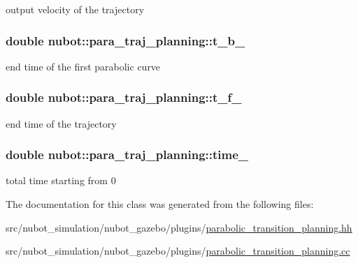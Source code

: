 output velocity of the trajectory 

\hypertarget{classnubot_1_1para__traj__planning_a89b8a9abfcb47b34ac861127fe26b8ca}{
\subsubsection[{t\-\_\-b\-\_\-}]{\setlength{\rightskip}{0pt plus 5cm}double nubot\-::para\-\_\-traj\-\_\-planning\-::t\-\_\-b\-\_\-\hspace{0.3cm}{\ttfamily [private]}}}\label{classnubot_1_1para__traj__planning_a89b8a9abfcb47b34ac861127fe26b8ca}


end time of the first parabolic curve 

\hypertarget{classnubot_1_1para__traj__planning_a9c93d92b950dcb6f34b3c3b843aad823}{
\subsubsection[{t\-\_\-f\-\_\-}]{\setlength{\rightskip}{0pt plus 5cm}double nubot\-::para\-\_\-traj\-\_\-planning\-::t\-\_\-f\-\_\-\hspace{0.3cm}{\ttfamily [private]}}}\label{classnubot_1_1para__traj__planning_a9c93d92b950dcb6f34b3c3b843aad823}


end time of the trajectory 

\hypertarget{classnubot_1_1para__traj__planning_a06fe0c4fbd1afaa2a33672a85705410a}{
\subsubsection[{time\-\_\-}]{\setlength{\rightskip}{0pt plus 5cm}double nubot\-::para\-\_\-traj\-\_\-planning\-::time\-\_\-\hspace{0.3cm}{\ttfamily [private]}}}\label{classnubot_1_1para__traj__planning_a06fe0c4fbd1afaa2a33672a85705410a}


total time starting from 0 



The documentation for this class was generated from the following files\-:\begin{DoxyCompactItemize}
\item 
src/nubot\-\_\-simulation/nubot\-\_\-gazebo/plugins/\hyperlink{parabolic__transition__planning_8hh}{parabolic\-\_\-transition\-\_\-planning.\-hh}\item 
src/nubot\-\_\-simulation/nubot\-\_\-gazebo/plugins/\hyperlink{parabolic__transition__planning_8cc}{parabolic\-\_\-transition\-\_\-planning.\-cc}\end{DoxyCompactItemize}
